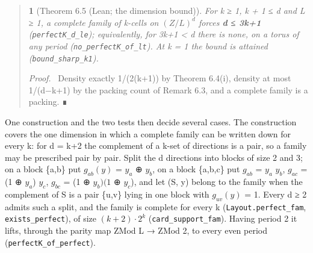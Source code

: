 \documentclass[11pt,a4paper]{article}
\theoremstyle{named}
\newtheorem*{namedthm}{}
\newenvironment{mdproof}[1][Proof]{\par\medskip\noindent\textit{#1.}\ }{\par\medskip}
\begin{document}
\begin{quote}
\begin{namedthm}[Theorem 6.5 (Lean; the dimension bound)]
For k ≥ 1, k + 1 ≤ d and L ≥ 1, a complete family of k-cells on $(Z/L)^d$ forces \textbf{d ≤ 3k+1} (\texttt{perfectK\_\allowbreak{}d\_\allowbreak{}le}); equivalently, for 3k+1 \textless{} d there is none, on a torus of any period (\texttt{no\_\allowbreak{}perfectK\_\allowbreak{}of\_\allowbreak{}lt}). At k = 1 the bound is attained (\texttt{bound\_\allowbreak{}sharp\_\allowbreak{}k1}).
\end{namedthm}
\begin{mdproof}[Proof]
Density exactly 1/(2(k+1)) by Theorem 6.4(i), density at most 1/(d−k+1) by the packing count of Remark 6.3, and a complete family is a packing. ∎
\end{mdproof}
\end{quote}
One construction and the two tests then decide several cases. The construction covers the one dimension in which a complete family can be written down for every k: for d = k+2 the complement of a k-set of directions is a pair, so a family may be prescribed pair by pair. Split the d directions into blocks of size 2 and 3; on a block \{a,b\} put $g_{ab}(y)$ = $y_a$ ⊕ $y_b$, on a block \{a,b,c\} put $g_{ab}$ = $y_a$ $y_b$, $g_{ac}$ = (1 ⊕ $y_a$) $y_c$, $g_{bc}$ = (1 ⊕ $y_b)(1$ ⊕ $y_c$), and let (S, y) belong to the family when the complement of S is a pair \{u,v\} lying in one block with $g_{uv}(y)$ = 1. Every d ≥ 2 admits such a split, and the family is complete for every k (\texttt{Layout.\allowbreak{}perfect\_\allowbreak{}fam}, \texttt{exists\_\allowbreak{}perfect}), of size $(k+2)·2^k$ (\texttt{card\_\allowbreak{}support\_\allowbreak{}fam}). Having period 2 it lifts, through the parity map ZMod L → ZMod 2, to every even period (\texttt{perfectK\_\allowbreak{}of\_\allowbreak{}perfect}).
\end{document}
